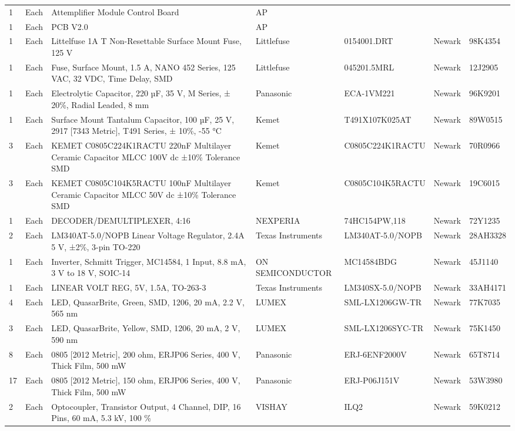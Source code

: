 \documentclass[12pt,a4paper,oneside]{article}
\begin{document}
\begin{landscape}
\begin{table}[H]
{\begin{tabular}{@{}lllllll@{}}
1 & Each & Attemplifier Module Control Board & AP\\
1 & Each & PCB V2.0 & AP\\
1 & Each & Littelfuse 1A T Non-Resettable Surface Mount Fuse, 125 V & Littlefuse & 0154001.DRT & Newark & 98K4354\\ 
1 & Each & Fuse, Surface Mount, 1.5 A, NANO 452 Series, 125 VAC, 32 VDC, Time Delay, SMD & Littlefuse & 045201.5MRL & Newark & 12J2905\\
1 & Each & Electrolytic Capacitor, 220 µF, 35 V, M Series, ± 20\%, Radial Leaded, 8 mm & Panasonic & ECA-1VM221 & Newark & 96K9201\\
1 & Each & Surface Mount Tantalum Capacitor, 100 µF, 25 V, 2917 [7343 Metric], T491 Series, ± 10\%, -55 °C & Kemet & T491X107K025AT & Newark & 89W0515\\
3 & Each & KEMET C0805C224K1RACTU 220nF Multilayer Ceramic Capacitor MLCC 100V dc ±10\% Tolerance SMD & Kemet & C0805C224K1RACTU & Newark & 70R0966\\
3 & Each & KEMET C0805C104K5RACTU 100nF Multilayer Ceramic Capacitor MLCC 50V dc ±10\% Tolerance SMD & Kemet & C0805C104K5RACTU & Newark & 19C6015\\
1 & Each & DECODER/DEMULTIPLEXER, 4:16 & NEXPERIA & 74HC154PW,118 & Newark & 72Y1235\\
2 & Each & LM340AT-5.0/NOPB Linear Voltage Regulator, 2.4A 5 V, ±2\%, 3-pin TO-220 &  Texas Instruments & LM340AT-5.0/NOPB & Newark & 28AH3328\\
1 & Each & Inverter, Schmitt Trigger, MC14584, 1 Input, 8.8 mA, 3 V to 18 V, SOIC-14 & ON SEMICONDUCTOR & MC14584BDG & Newark & 45J1140\\
1 & Each &  LINEAR VOLT REG, 5V, 1.5A, TO-263-3 & Texas Instruments & LM340SX-5.0/NOPB & Newark & 33AH4171\\
4 & Each & LED, QuasarBrite, Green, SMD, 1206, 20 mA, 2.2 V, 565 nm & LUMEX & SML-LX1206GW-TR & Newark & 77K7035\\
3 & Each & LED, QuasarBrite, Yellow, SMD, 1206, 20 mA, 2 V, 590 nm & LUMEX & SML-LX1206SYC-TR & Newark & 75K1450\\
8 & Each & 0805 [2012 Metric], 200 ohm, ERJP06 Series, 400 V, Thick Film, 500 mW & Panasonic & ERJ-6ENF2000V & Newark & 65T8714\\
17 & Each & 0805 [2012 Metric], 150 ohm, ERJP06 Series, 400 V, Thick Film, 500 mW & Panasonic & ERJ-P06J151V & Newark & 53W3980\\
2 & Each & Optocoupler, Transistor Output, 4 Channel, DIP, 16 Pins, 60 mA, 5.3 kV, 100 \% & VISHAY & ILQ2 & Newark & 59K0212\\

\end{tabular}}
\end{table}
\end{landscape}
\end{document}
